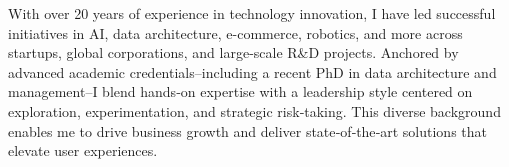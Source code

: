 


\begin{cvparagraph}









With over 20 years of experience in technology innovation, I have led successful initiatives in AI, data architecture, e-commerce, robotics, and more across startups, global corporations, and large-scale R\&D projects. Anchored by advanced academic credentials--including a recent PhD in data architecture and management--I blend hands‑on expertise with a leadership style centered on exploration, experimentation, and strategic risk‑taking. This diverse background enables me to drive business growth and deliver state‑of‑the‑art solutions that elevate user experiences.


\end{cvparagraph}

\vspace{-0.5ex}

